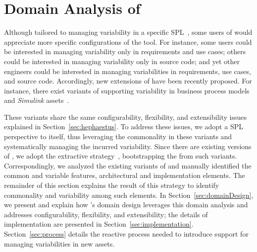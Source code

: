 
\section{Domain Analysis of \hpl}
\label{sec:domainAnalysis}

Although tailored to managing variability in a specific SPL~\cite{ferreira:2010}, some users of \hp{} would appreciate more specific configurations of the tool. For instance, some users could be interested in managing variability only in requirements and use cases; others could be interested in managing variability only in source code; and yet other engineers could be interested in managing variabilities in requirements, use cases, and source code.  Accordingly, new extensions of \hp{} have been recently proposed. For instance, there exist variants of \hp{} supporting variability in business process models~\cite{Machado:2011:MVB:1960502.1960508} and \emph{Simulink} assets~\cite{simulink}.

These variants share the same configurability, flexibility, and extensibility issues explained in Section~\ref{sec:hephaestus}. To address these issues, we adopt a SPL perspective to \hp{} itself, thus leveraging the commonality in these variants and systematically managing the incurred variability. Since there are existing versions of \hp, we adopt the extractive strategy~\cite{kruegerPFE01}, bootstrapping the \hpl{} from such variants. Correspondingly, we analyzed the existing variants of \hp{} and manually identified the common and variable features, architectural and implementation elements. The remainder of this section explains the result of this strategy to identify commonality and variability among such elements. In Section~\ref{sec:domainDesign}, we present and explain how \hpl's domain design leverages this domain analysis and addresses configurability, flexibility, and extensibility; the details of implementation are presented in Section~\ref{sec:implementation}. Section~\ref{sec:process} details the reactive process needed to introduce support for managing variabilities in new assets.


